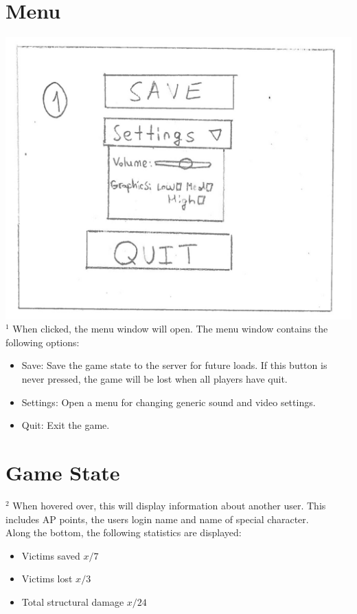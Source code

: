 \documentclass[12pt]{article}
\theoremstyle{definition}
\begin{document}
\section*{Menu}
\includegraphics[scale=0.5]{MainMenu}\\
$^1$ When clicked, the menu window will open. The menu window contains the following options:
\begin{itemize}
	\item Save: Save the game state to the server for future loads. If this button is never pressed, the game will be lost when all players have quit.
	\item Settings: Open a menu for changing generic sound and video settings.
	\item Quit: Exit the game.
\end{itemize}

\section*{Game State}
$^2$ When hovered over, this will display information about another user. This includes AP points, the users login name and name of special character.
\\ \linebreak
Along the bottom, the following statistics are displayed:
\begin{itemize}
	\item Victims saved $x/7$
	\item Victims lost $x/3$
	\item Total structural damage $x/24$
\end{itemize}
\end{document}
